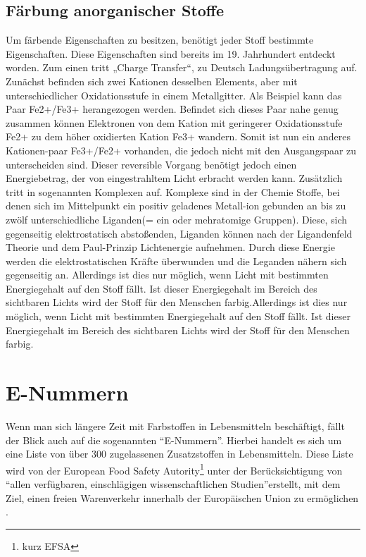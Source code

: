 \documentclass[11pt]{scrreprt}
\begin{document}
\section{Färbung anorganischer Stoffe}
Um färbende Eigenschaften zu besitzen, benötigt jeder Stoff bestimmte Eigenschaften. Diese Eigenschaften sind bereits im 19. Jahrhundert entdeckt worden. 
Zum einen tritt „Charge Transfer“, zu Deutsch Ladungsübertragung auf. Zunächst befinden sich zwei Kationen desselben Elements, aber mit unterschiedlicher Oxidationsstufe in einem Metallgitter. Als Beispiel kann das Paar Fe2+/Fe3+ herangezogen werden. Befindet sich dieses Paar nahe genug zusammen können Elektronen von dem Kation mit geringerer Oxidationsstufe Fe2+ zu dem höher oxidierten Kation Fe3+ wandern. Somit ist nun ein anderes Kationen-paar Fe3+/Fe2+ vorhanden, die jedoch nicht mit den Ausgangspaar zu unterscheiden sind. Dieser reversible Vorgang benötigt jedoch einen Energiebetrag, der von eingestrahltem Licht erbracht werden kann.  Zusätzlich tritt in sogenannten Komplexen auf. Komplexe sind in der Chemie Stoffe, bei denen sich im Mittelpunkt ein positiv geladenes Metall-ion gebunden an bis zu zwölf unterschiedliche Liganden(= ein oder mehratomige Gruppen). Diese, sich gegenseitig elektrostatisch abstoßenden, Liganden können  nach der Ligandenfeld Theorie und dem Paul-Prinzip Lichtenergie aufnehmen. Durch diese Energie werden die elektrostatischen Kräfte überwunden und die Leganden nähern sich gegenseitig an. Allerdings ist dies nur möglich, wenn Licht mit bestimmten Energiegehalt auf den Stoff fällt. Ist dieser Energiegehalt im Bereich des sichtbaren Lichts wird der Stoff für den Menschen farbig.Allerdings ist dies nur möglich, wenn Licht mit bestimmten Energiegehalt auf den Stoff fällt. Ist dieser Energiegehalt im Bereich des sichtbaren Lichts wird der Stoff für den Menschen farbig.
\chapter{E-Nummern}
Wenn man sich längere Zeit mit Farbstoffen in Lebensmitteln beschäftigt, fällt der Blick auch auf die sogenannten \enquote{E-Nummern}. Hierbei handelt es sich um eine Liste von über 300 zugelassenen Zusatzstoffen in Lebensmitteln. Diese Liste wird von der European Food Safety Autority\footnote{kurz EFSA} unter der Berücksichtigung von \enquote{allen verfügbaren, einschlägigen wissenschaftlichen Studien}erstellt, mit dem Ziel, einen freien Warenverkehr innerhalb der Europäischen Union zu ermöglichen \parencite{EFSAisanagencyoftheEuropeanUnion.2016}.
\end{document}
